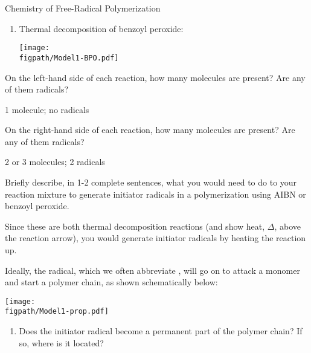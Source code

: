 \begin{activity}{Chemistry of Free-Radical Polymerization}
\begin{model}[Initiation]
\begin{enumerate}
		\item Thermal decomposition of benzoyl peroxide:
	
			\centerline{\texttt{[image: \\figpath/Model1-BPO.pdf]}}
			
	\end{enumerate}
	
	
\end{model}


\begin{ctqs}

	\question On the left-hand side of each reaction, how many molecules are present?  Are any of them radicals?
	
		\begin{solution}[0.5in]
		
			1 molecule; no radicals
			
		\end{solution}
	
	\question On the right-hand side of each reaction, how many molecules are present? Are any of them radicals?
	
		\begin{solution}[0.5in]
		
			2 or 3 molecules; 2 radicals
			
		\end{solution}
	
	\question Briefly describe, in 1-2 complete sentences, what you would need to do to your reaction mixture to generate initiator radicals in a polymerization using AIBN or benzoyl peroxide.
	
		\begin{solution}[1.5in]
			Since these are both thermal decomposition reactions (and show heat, $\Delta$, above the reaction arrow), you would generate initiator radicals by heating the reaction up.
		\end{solution}
		
	\question Ideally, the radical, which we often abbreviate , will go on to attack a monomer and start a polymer chain, as shown schematically below:
	
			\centerline{\texttt{[image: \\figpath/Model1-prop.pdf]}}
	
		\begin{enumerate}
			\item Does the initiator radical become a permanent part of the polymer chain?  If so, where is it located?
	

\end{enumerate}
\end{ctqs}
\end{activity}
